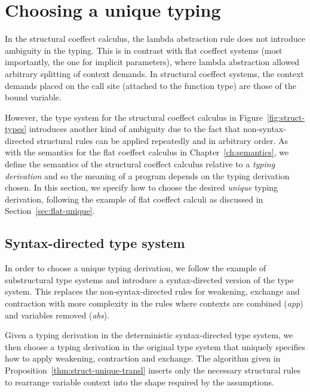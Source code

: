 
\section{Choosing a unique typing}
\label{sec:struct-unique}

In the structural coeffect calculus, the lambda abstraction rule does not introduce ambiguity
in the typing. This is in contrast with flat coeffect systems (most importantly, the one for
implicit parameters), where lambda abstraction allowed arbitrary splitting of context demands.
In structural coeffect systems, the context demands placed on the call site (attached to
the function type) are those of the bound variable.

However, the type system for the structural coeffect calculus in Figure~\ref{fig:struct-types}
introduces another kind of ambiguity due to the fact that non-syntax-directed structural rules
can be applied repeatedly and in arbitrary order. As with the semantics for the flat coeffect calculus
in Chapter~\ref{ch:semantics}, we define the semantics of the structural coeffect calculus relative to
a \emph{typing derivation} and so the meaning of a program depends on the typing derivation chosen.
In this section, we specify how to choose the desired \emph{unique} typing derivation, following
the example of flat coeffect calculi as discussed in Section~\ref{sec:flat-unique}.


\subsection{Syntax-directed type system}

In order to choose a unique typing derivation, we follow the example of substructural type systems
\cite{substruct-attpl-intro} and introduce a syntax-directed version of the type system.
This replaces the non-syntax-directed rules for weakening, exchange and contraction with
more complexity in the rules where contexts are combined  (\emph{app}) and variables removed (\emph{abs}).

Given a typing derivation in the deterministic syntax-directed type system, we then choose a
typing derivation in the original type system that uniquely specifies how to apply weakening,
contraction and exchange. The algorithm given in Proposition~\ref{thm:struct-unique-transl}
inserts only the necessary structural rules to rearrange variable context into the shape
required by the assumptions.

